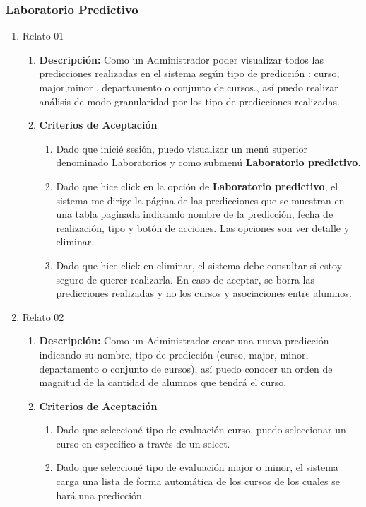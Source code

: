 \subsubsection{Laboratorio Predictivo}

\begin{enumerate}
	\item Relato 01
		\begin{enumerate}
			\item \textbf{Descripción:} Como un Administrador poder visualizar todos las predicciones realizadas en el sistema según tipo de predicción : curso, major,minor , departamento o conjunto de cursos., así puedo realizar análisis de modo granularidad por los tipo de predicciones realizadas.
			\item \textbf{Criterios de Aceptación}
				\begin{enumerate}
					\item Dado que inicié sesión, puedo visualizar un menú superior denominado Laboratorios y como submenú \textbf{Laboratorio predictivo}.
					\item Dado que hice click en la opción de \textbf{Laboratorio predictivo}, el sistema me dirige la página de las predicciones que se muestran en una tabla paginada indicando  nombre de la predicción, fecha de realización, tipo y botón de acciones. Las opciones son ver detalle y eliminar.
					\item Dado que hice click en eliminar, el sistema debe consultar si estoy seguro de querer realizarla. En caso de aceptar, se borra las predicciones realizadas y no los cursos y asociaciones entre alumnos.
				\end{enumerate}
		\end{enumerate}
	\item Relato 02
		\begin{enumerate}
			\item \textbf{Descripción:} Como un Administrador crear una nueva predicción indicando su nombre, tipo de predicción (curso, major, minor, departamento o conjunto de cursos), así puedo conocer un orden de magnitud de la cantidad de alumnos que tendrá el curso.
			\item \textbf{Criterios de Aceptación}
				\begin{enumerate}
					\item Dado que seleccioné tipo de evaluación curso, puedo seleccionar un curso en específico a través de un select.
					\item Dado que seleccioné tipo de evaluación major o minor, el sistema carga una lista de forma automática de los cursos de los cuales se hará una predicción.

\end{enumerate}
\end{enumerate}
\end{enumerate}
